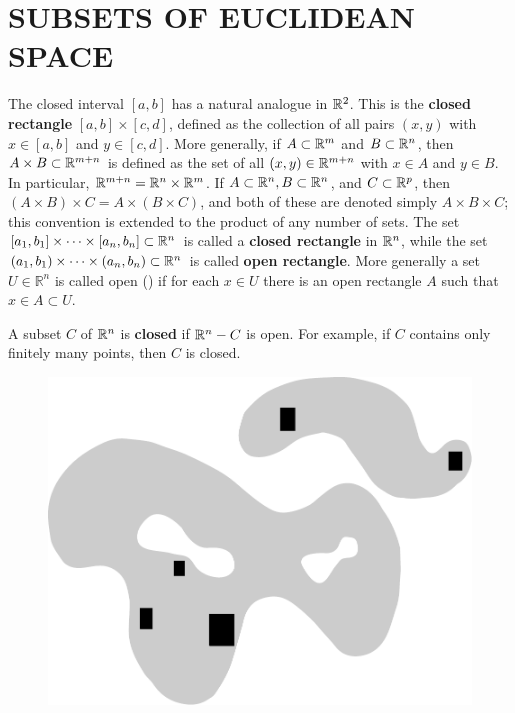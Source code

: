 \clearpage
\section[\textsc{subset of euclidean space}]{SUBSETS OF EUCLIDEAN SPACE}
The closed interval $[a,b]$ has a natural analogue in $\mathbb{R}^2$. 
This is the \textbf{closed rectangle} $[a,b]\times [c,d]$, 
defined as the collection of all pairs $(x,y)$ with $x\in [ a, b] $ and $y\in [c, d]$.
More generally, if $A\subset\mathbb{R}^m$ and $B\subset\mathbb{R}^n$, 
then $A\times B\subset\mathbb{R}^{m+n}$ is defined as the set of all  
$(x, y) \in \mathbb{R}^{m+n}$ with $x\in A$ and $y\in B$.
In particular, $\mathbb{R}^{m+n} = \mathbb{R}^n\times \mathbb{R}^m$.
If $A\subset \mathbb{R}^n, B\subset \mathbb{R}^n$, and $C\subset \mathbb{R}^p$,
then $(A\times B)\times C = A\times(B\times C)$, and 
both of these are denoted simply $A\times B\times C$; this 
convention is extended to the product of any number of sets.
The set $[a_1, b_1]\times \cdots \times [a_n,b_n]\subset \mathbb{R}^n$ 
is called a \textbf{closed rectangle} in $\mathbb{R}^n$, while the set 
$(a_1, b_1)\times \cdots \times (a_n,b_n)\subset \mathbb{R}^n$
is called \textbf{open rectangle}. More generally a set $U\in\mathbb{R}^n$ is called open () 
if for each $x\in U$ there is an open rectangle $A$ such that $x\in A\subset U$.

A subset $C$ of $\mathbb{R}^n$ is \textbf{closed} if $\mathbb{R}^n - C$ is open.
For example, if $C$ contains only finitely many points, then $C$ is 
closed.

\begin{figure}[!htb]
    \centering
    \includegraphics[width=.75\linewidth]{./pics/Fig1-1.pdf}
    \caption{}
    \label{Fig 1-1}
\end{figure}

